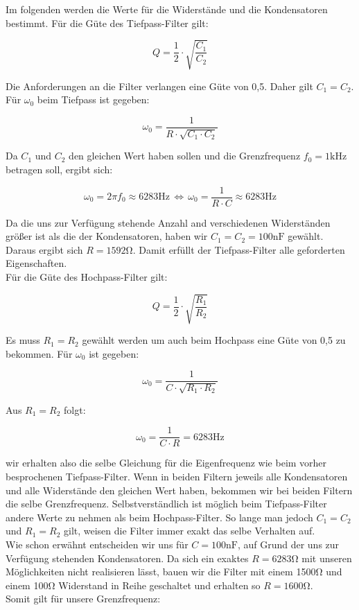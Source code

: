 Im folgenden werden die Werte für die Widerstände und die Kondensatoren bestimmt.
Für die Güte des Tiefpass-Filter gilt:

$$ Q = \frac{1}{2}\cdot\sqrt{\frac{C_{1}}{C_{2}}} $$

Die Anforderungen an die Filter verlangen eine Güte von 0,5. Daher gilt $C_{1}=C_{2}$.\\
Für $\omega_{0}$ beim Tiefpass ist gegeben:

$$\omega_{0}=\frac{1}{R\cdot\sqrt{C_{1} \cdot C_{2}}}$$

Da $C_{1}$ und $C_{2}$ den gleichen Wert haben sollen und die Grenzfrequenz $f_{0}=1\si{\kilo\hertz}$ betragen soll, ergibt sich:

$$\omega_{0}=2\pi f_{0} \approx 6283\si{\hertz} \, \Leftrightarrow \,\omega_{0}=\frac{1}{R\cdot C}\approx 6283\si{\hertz} $$

Da die uns zur Verfügung stehende Anzahl and verschiedenen Widerständen größer ist als die der Kondensatoren, haben wir $C_{1}=C_{2}=100\si{\nano\farad}$ gewählt.
Daraus ergibt sich $R=1592\si{\ohm}$. Damit erfüllt der Tiefpass-Filter alle geforderten Eigenschaften. \\
Für die Güte des Hochpass-Filter gilt:

$$Q=\frac{1}{2}\cdot\sqrt{\frac{R_{1}}{R_{2}}}$$

Es muss $R_{1}=R_{2}$ gewählt werden um auch beim Hochpass eine Güte von 0,5 zu bekommen.
Für $\omega_{0}$ ist gegeben:

$$\omega_{0} = \frac{1}{C\cdot\sqrt{R_{1}\cdot R_{2}}}$$

Aus $R_{1}=R_{2}$ folgt:

$$\omega_{0} = \frac{1}{C\cdot R}=6283\si{\hertz}$$

wir erhalten also die selbe Gleichung für die Eigenfrequenz wie beim vorher besprochenen Tiefpass-Filter. Wenn in beiden Filtern jeweils alle Kondensatoren und alle Widerstände den gleichen Wert haben, bekommen wir bei beiden Filtern die selbe Grenzfrequenz. Selbstverständlich ist möglich beim Tiefpass-Filter andere Werte zu nehmen als beim Hochpass-Filter. So lange man jedoch $C_{1}=C_{2}$ und $R_{1}=R_{2}$ gilt, weisen die Filter immer exakt das selbe Verhalten auf.\\
Wie schon erwähnt entscheiden wir uns für $C=100\si{\nano\farad}$, auf Grund der uns zur Verfügung stehenden Kondensatoren. Da sich ein exaktes $R=6283\si{\ohm}$ mit unseren Möglichkeiten nicht realisieren lässt, bauen wir die Filter mit einem 1500\si{\ohm} und einem 100\si{\ohm} Widerstand in Reihe geschaltet und erhalten so $R=1600\si{\ohm}$.\\
Somit gilt für unsere Grenzfrequenz:

